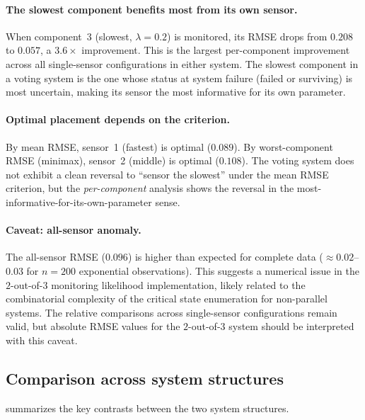 \documentclass[12pt]{article}
\theoremstyle{definition}
\theoremstyle{remark}
\begin{document}
\paragraph{The slowest component benefits most from its own sensor.}
When component~3 (slowest, $\lambda = 0.2$) is monitored, its RMSE
drops from $0.208$ to $0.057$, a $3.6\times$ improvement.  This is
the largest per-component improvement across all single-sensor
configurations in either system.  The slowest component in a voting
system is the one whose status at system failure (failed or surviving)
is most uncertain, making its sensor the most informative for its own
parameter.

\paragraph{Optimal placement depends on the criterion.}
By mean RMSE, sensor~1 (fastest) is optimal ($0.089$).  By
worst-component RMSE (minimax), sensor~2 (middle) is optimal
($0.108$).  The voting system does not exhibit a clean reversal to
``sensor the slowest'' under the mean RMSE criterion, but the
\emph{per-component} analysis shows the reversal in the
most-informative-for-its-own-parameter sense.

\paragraph{Caveat: all-sensor anomaly.}
The all-sensor RMSE ($0.096$) is higher than expected for complete
data ($\approx 0.02$--$0.03$ for $n = 200$ exponential observations).
This suggests a numerical issue in the $2$-out-of-$3$ monitoring
likelihood implementation, likely related to the combinatorial
complexity of the critical state enumeration for non-parallel systems.
The relative comparisons across single-sensor configurations remain
valid, but absolute RMSE values for the $2$-out-of-$3$ system should
be interpreted with this caveat.

\subsection{Comparison across system structures}
\label{sec:comparison}

 summarizes the key contrasts between the two
system structures.
\end{document}

